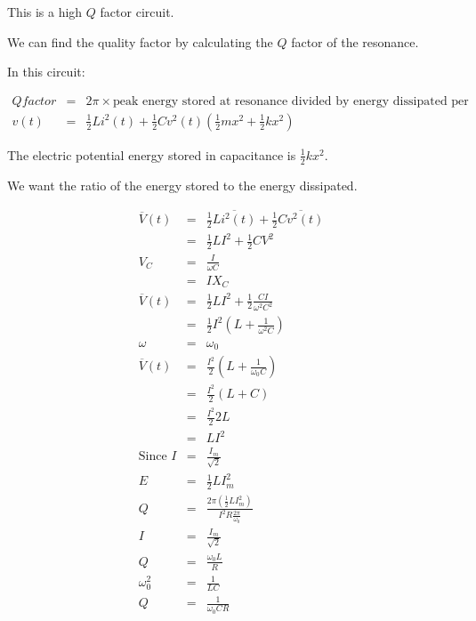 \documentclass[a4paper,12pt]{article}
\begin{document}
This is a high $Q$ factor circuit.

We can find the quality factor by calculating the $Q$ factor of the
resonance.

In this circuit:

\begin{eqnarray*}
Q factor & = & 2 \pi \times \mbox{peak energy stored at resonance
divided by energy dissipated per cycle} \\
v(t) & = & \frac{1}{2} L i^{2}(t) + \frac{1}{2}
Cv^{2}(t)\left(\frac{1}{2} mx^{2} + \frac{1}{2} kx^{2} \right)
\end{eqnarray*}

The electric potential energy stored in capacitance is $\frac{1}{2} k
x^{2}$.

We want the ratio of the energy stored to the energy dissipated.

\begin{eqnarray*}
\overline{V}(t) & = & \frac{1}{2} \overline{Li^{2}(t)} + \frac{1}{2}
\overline{C v^{2}(t)} \\
			& = & \frac{1}{2} LI^{2} + \frac{1}{2} CV^{2} \\
V_{C}		& = & \frac{I}{\omega C} \\
			& = & IX_{C} \\
\overline{V}(t) & = & \frac{1}{2} LI^{2} + \frac{1}{2}
\frac{CI}{\omega^{2} C^{2}} \\
			& = & \frac{1}{2} I^{2} \left( L + \frac{1}{\omega^{2} C}
			\right) \\
\omega & = & \omega_{0} \\
\overline{V}(t) & = & \frac{I^{2}}{2} \left(L + \frac{1}{\omega_{0} C}
\right)\\
		 & = & \frac{I^{2}}{2} (L + C) \\
		 & = & \frac{I^{2}}{2} 2L \\
		 & = & L I^{2} \\
\mbox{Since } I & = & \frac{I_{m}}{\sqrt{2}} \\
E & = & \frac{1}{2} LI_{m}^{2} \\
Q & = & \frac{2 \pi \left(\frac{1}{2} L I_{m}^{2} \right)}{I^{2} R
\frac{2 \pi}{\omega_{0}}} \\
I & = & \frac{I_{m}}{\sqrt{2}} \\
Q & = & \frac{\omega_{0} L}{R} \\
\omega_{0}^{2} & = & \frac{1}{LC} \\
Q & = & \frac{1}{\omega_{0} CR}
\end{eqnarray*}
\end{document}
